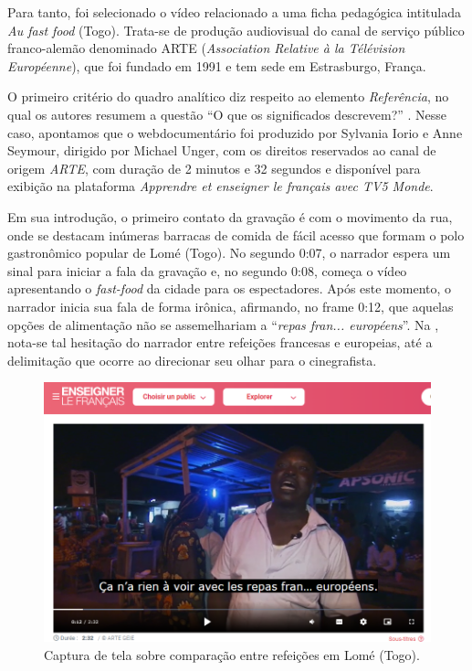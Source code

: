 \documentclass[portuguese]{textolivre}
\begin{document}
Para tanto, foi selecionado o vídeo relacionado a uma ficha pedagógica intitulada \textit{Au fast food} (Togo). Trata-se de produção audiovisual do canal de serviço público franco-alemão denominado  ARTE (\textit{Association Relative à la Télévision Européenne}),  que foi fundado em 1991 e tem sede em Estrasburgo, França. 

O primeiro critério do quadro analítico diz respeito ao elemento \emph{Referência}, no qual os autores resumem a questão “O que os significados descrevem?” \cite[p. 293]{kalantzis_letramentos_2020}. Nesse caso, apontamos que o webdocumentário foi produzido por Sylvania Iorio e Anne Seymour, dirigido por Michael Unger, com os direitos reservados ao canal de origem \textit{ARTE}, com duração de 2 minutos e 32 segundos e disponível para exibição na plataforma \textit{Apprendre et enseigner le français avec TV5 Monde}.

Em sua introdução, o primeiro contato da gravação é com o movimento da rua, onde se destacam inúmeras barracas de comida de fácil acesso que formam o polo gastronômico popular de Lomé (Togo). No segundo 0:07, o narrador espera um sinal para iniciar a fala da gravação e, no segundo 0:08, começa o vídeo apresentando o \textit{fast-food} da cidade para os espectadores. Após este momento, o narrador inicia sua fala de forma irônica, afirmando, no frame 0:12, que aquelas opções de alimentação não se assemelhariam a “\textit{repas fran... européens}”. Na , nota-se tal hesitação do narrador entre refeições francesas e europeias, até a delimitação que ocorre ao direcionar seu olhar para o cinegrafista.

\begin{figure}[h]
    \centering
    \begin{minipage}{.55\textwidth}
    \includegraphics[width=\linewidth]{Fig6.png}
    \caption{Captura de tela sobre comparação entre refeições em Lomé (Togo).}
    \label{fig6}
    \end{minipage}
\end{figure}
\end{document}
